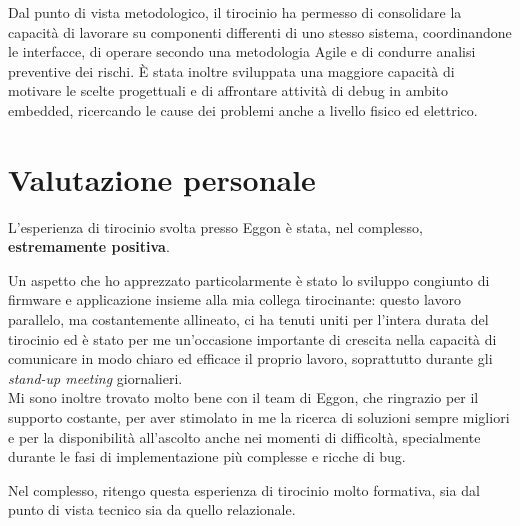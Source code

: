 Dal punto di vista metodologico, il tirocinio ha permesso di consolidare la capacità di lavorare 
su componenti differenti di uno stesso sistema, coordinandone le interfacce, di operare secondo 
una metodologia Agile e di condurre analisi preventive dei rischi. È stata inoltre sviluppata una 
maggiore capacità di motivare le scelte progettuali e di affrontare attività di debug in ambito 
embedded, ricercando le cause dei problemi anche a livello fisico ed elettrico.

\section{Valutazione personale}
\label{sec:valutazione-personale}

L'esperienza di tirocinio svolta presso Eggon è stata, nel complesso, \textbf{estremamente positiva}. 

Un aspetto che ho apprezzato particolarmente è stato lo sviluppo congiunto di firmware e
applicazione insieme alla mia collega tirocinante: questo lavoro parallelo, ma costantemente
allineato, ci ha tenuti uniti per l'intera durata del tirocinio ed è stato per me un'occasione
importante di crescita nella capacità di comunicare in modo chiaro ed efficace il proprio
lavoro, soprattutto durante gli \textit{stand-up meeting} giornalieri. \\

Mi sono inoltre trovato molto bene con il team di Eggon, che ringrazio per il supporto costante, 
per aver stimolato in me la ricerca di soluzioni sempre migliori e per la disponibilità all'ascolto 
anche nei momenti di difficoltà, specialmente durante le fasi di implementazione più complesse e 
ricche di bug.

Nel complesso, ritengo questa esperienza di tirocinio molto formativa, sia dal punto di vista
tecnico sia da quello relazionale.

\newpage